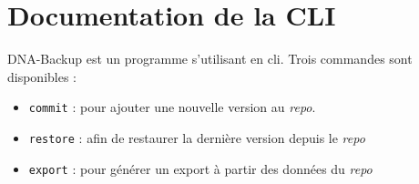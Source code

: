 \documentclass[a4paper]{report}
\begin{document}





\appendix
\addappheadtotoc

\chapter{Documentation de la CLI}

DNA-Backup est un programme s'utilisant en \ac{cli}.
Trois commandes sont disponibles :

\begin{itemize}
  \item \verb|commit| : pour ajouter une nouvelle version au \emph{repo}.
  \item \verb|restore| : afin de restaurer la dernière version depuis le \emph{repo}
  \item \verb|export| : pour générer un export à partir des données du \emph{repo}
\end{itemize}
\end{document}
